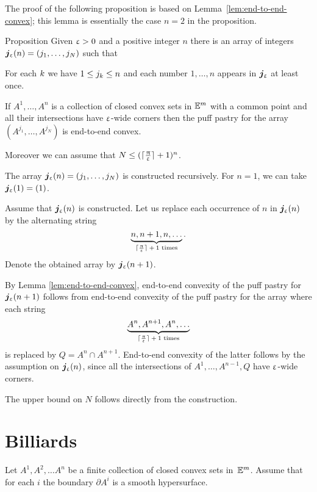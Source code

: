 The proof of the following proposition is based on Lemma~\ref{lem:end-to-end-convex};
this lemma is essentially the case $n=2$ in the proposition.

\begin{thm}{Proposition}\label{prop:end-to-end-convex}
Given $\upvarepsilon>0$ and a positive integer $n$
there is an array of integers $\bm{j}_\eps(n)=(j_1,\dots,j_N)$ 
such that 

\begin{subthm}{} For each $k$ we have $1\le j_\kay\le n$
and each number $1,\dots,n$ appears in $\bm{j}_\upvarepsilon$ at least once.
\end{subthm}

\begin{subthm}{}
If $A^1,\dots,A^n$ is a collection of closed convex sets in $\mathbb{E}^m$ with a common point 
and all their intersections have $\upvarepsilon$-wide corners 
then the puff pastry for the array
$(A^{j_1},\dots,A^{j_N})$ is end-to-end convex.
\end{subthm}

Moreover we can assume that $N\le (\lceil\tfrac\pi\eps\rceil+1)^n$.
\end{thm}

The array $\bm{j}_\eps(n)=(j_1,\dots,j_N)$  is constructed recursively.
For $n=1$, we can take $\bm{j}_\upvarepsilon(1)=(1)$.

Assume that $\bm{j}_\upvarepsilon(n)$ is constructed.
Let us replace each occurrence of $n$ in $\bm{j}_\upvarepsilon(n)$ by the alternating string 
\[\underbrace{n,n+1,n,\dots}_{\text{$\lceil\tfrac\pi\eps\rceil+1$ times}}.\]
Denote the obtained array by $\bm{j}_\upvarepsilon(n+1)$.

By Lemma \ref{lem:end-to-end-convex},
end-to-end convexity of the puff pastry for $\bm{j}_\eps(n\z+1)$
follows from end-to-end convexity of the puff pastry for the array
where each string
\[\underbrace{A^n,A^{n+1},A^n,\dots}_{\text{$\lceil\tfrac\pi\eps\rceil+1$ times}}\]
is replaced by  $Q=A^n\cap A^{n+1}$.
End-to-end convexity of the latter follows by the assumption on $\bm{j}_\upvarepsilon(n)$, 
since all the intersections of $A^1,\dots,A^{n-1},Q$
have $\upvarepsilon$-wide corners.

The upper bound on $N$ follows directly from the construction.
\qeds



\section{Billiards}

Let $A^1,A^2,\dots A^n$ be a finite collection of closed convex sets in~$\mathbb{E}^m$.
Assume that for each $i$
the boundary $\partial A^i$ is a smooth hypersurface.

